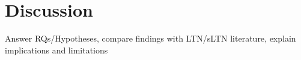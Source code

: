 \chapter{Discussion}
Answer RQs/Hypotheses, compare findings with LTN/sLTN literature, explain implications and limitations
\label{chap:discussion}